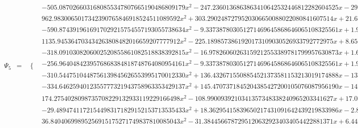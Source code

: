 \documentclass{article}
\begin{document}
\begin{landscape}
\begin{eqnarray*}
\begin{array}{cc}
\end{array}\\
\Psi_5 & = & \begin{array}{cc}
 \{ & 
\begin{array}{cc}
 -505.0870266031680855347807665190486809179 x^2-247.2360136863863410642532446812282604525 x-29.92222277980770976840598553050584058134 & x\geq -\frac{1}{4}\land x<-\frac{3}{16} \\
 962.9830065017342390765846918524511089592 x^2+303.2902487279520306650088022080841607514 x+21.68961432153651258121233136536719890652 & x\geq -\frac{3}{16}\land x<-\frac{1}{8} \\
 -590.8743919616917029215754557193055738634 x^2-9.337387803051271469645868646065108325561 x+1.911609763361921177299913525359917464736 & x\geq 0\land x<\frac{1}{16} \\
 1135.945364703434263808482016659207777912 x^2-225.1898573861920173109030526933792772975 x+8.656999437835069484839200526838485245109 & x\geq \frac{1}{16}\land x<\frac{1}{8} \\
 -318.0910308206002520855861082518838392815 x^2-16.97826060263159212553389781799957630873 x+1.672832488375036156803412613736965340262 & x\geq -\frac{1}{8}\land x<-\frac{1}{16} \\
 -256.9640484239576868384818748764080954161 x^2-9.337387803051271469645868646065108325561 x+1.911609763361921177299913525359917464736 & x\geq -\frac{1}{16}\land x<0 \\
 -310.5447510448756139845626553995170012330 x^2+136.4326715508854521373581153213019174888 x-13.94440862073227235567712247407908942903 & x\geq \frac{1}{8}\land x<\frac{3}{16} \\
 -334.6462594012355777321943758963353429137 x^2+145.4707371845204385427200105076087956190 x-14.79172727388555233117980014779535925375 & x\geq \frac{3}{16}\land x<\frac{1}{4} \\
 174.2754028098735708229132933119229166498 x^2-108.9900939210341357348338240965203341627 x+17.01587661430876945351442917772078196897 & x\geq \frac{1}{4}\land x<\frac{5}{16} \\
 -29.48947411721544983171829152153713535433 x^2+18.36295415839650217431091642439219833986 x-2.883037148102267719789436528671801234554 & x\geq \frac{5}{16}\land x<\frac{3}{8} \\
 36.84040699895256915175271749837810085043 x^2-31.38445667872951206329234034054422881371 x+6.444602383858859949761174114753778856740 & x\geq \frac{3}{8}\land x<\frac{7}{16} \\

\end{array}
\end{array}
\end{eqnarray*}
\end{landscape}
\end{document}
